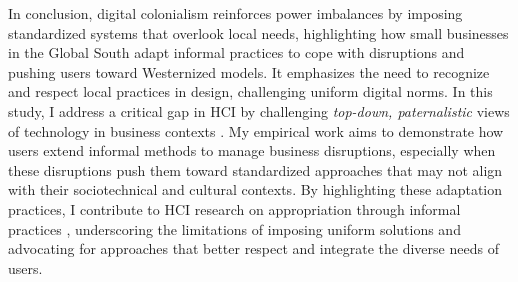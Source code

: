  In conclusion, digital colonialism reinforces power imbalances by imposing standardized systems that overlook local needs, highlighting how small businesses in the Global South adapt informal practices to cope with disruptions and pushing users toward Westernized models. It emphasizes the need to recognize and respect local practices in design, challenging uniform digital norms. In this study, I address a critical gap in HCI by challenging \textit{top-down, paternalistic} views of technology in business contexts \cite{10.1145/3025453.3025643, cruz2021decolonizing}. My empirical work aims to demonstrate how users extend informal methods to manage business disruptions, especially when these disruptions push them toward standardized approaches that may not align with their sociotechnical and cultural contexts. By highlighting these adaptation practices, I contribute to HCI research on appropriation through informal practices \cite{10.1145/3328020.3353927, 10.1145/3571811}, underscoring the limitations of imposing uniform solutions and advocating for approaches that better respect and integrate the diverse needs of users.


















